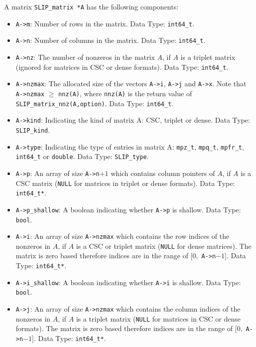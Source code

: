 \documentclass[12pt]{article}
\theoremstyle{definition}
\begin{document}
A matrix \verb|SLIP_matrix *A| has the following components:

\begin{itemize}
\item \verb|A->m|: Number of rows in the matrix. Data Type: \verb|int64_t|.

\item \verb|A->n|: Number of columns in the matrix. Data Type: \verb|int64_t|.

\item \verb|A->nz|: The number of nonzeros in the matrix $A$, if $A$ is
a triplet matrix (ignored for matrices in CSC or dense formats). Data Type:
\verb|int64_t|.

\item \verb|A->nzmax|: The allocated size of the vectors \verb|A->i|,
\verb|A->j| and \verb|A->x|. Note that \verb|A->nzmax| $\geq$ \verb|nnz(A)|,
where \verb|nnz(A)| is the return value of \verb|SLIP_matrix_nnz(A,option)|.
Data Type: \verb|int64_t|.

\item \verb|A->kind|: Indicating the kind of matrix A: CSC, triplet or dense.
Data Type: \verb|SLIP_kind|.

\item \verb|A->type|: Indicating the type of entries in matrix A: \verb|mpz_t|,
\verb|mpq_t|, \verb|mpfr_t|, \verb|int64_t| or \verb|double|.
Data Type: \verb|SLIP_type|.

\item \verb|A->p|: An array of size \verb|A->n|$+1$ which contains column pointers
of $A$, if $A$ is a CSC matrix (\verb|NULL| for matrices in triplet or dense
formats). Data Type: \verb|int64_t*|.

\item \verb|A->p_shallow|: A boolean indicating whether \verb|A->p| is shallow.
Data Type: \verb|bool|.

\item \verb|A->i|: An array of size \verb|A->nzmax| which contains the row
indices of the nonzeros in $A$, if $A$ is a CSC or triplet matrix (\verb|NULL|
for dense matrices). The matrix is zero based therefore indices are
in the range of $[0,$ \verb|A->n|$-1]$. Data Type: \verb|int64_t*|.

\item \verb|A->i_shallow|: A boolean indicating whether \verb|A->i| is shallow.
Data Type: \verb|bool|.

\item \verb|A->j|: An array of size \verb|A->nzmax| which contains the column
indices of the nonzeros in $A$, if $A$ is a triplet matrix (\verb|NULL| for
matrices in CSC or dense formats).
The matrix is zero based therefore indices are
in the range of $[0,$ \verb|A->n|$-1]$. Data Type: \verb|int64_t*|.


\end{itemize}
\end{document}
